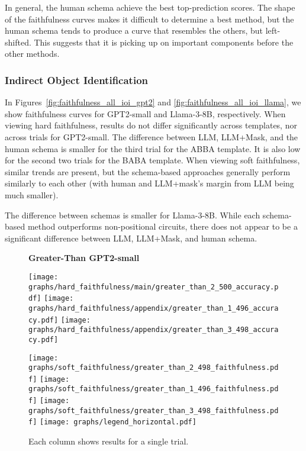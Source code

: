 In general, the human schema achieve the best top-prediction scores. The shape of the faithfulness curves makes it difficult to determine a best method, but the human schema tends to produce a curve that resembles the others, but left-shifted. This suggests that it is picking up on important components before the other methods. 

\subsubsection{Indirect Object Identification}\label{ap:faithfulness_curves_ioi}
In Figures~\ref{fig:faithfulness_all_ioi_gpt2} and \ref{fig:faithfulness_all_ioi_llama}, we show faithfulness curves for GPT2-small and Llama-3-8B, respectively. When viewing hard faithfulness, results do not differ significantly across templates, nor across trials for GPT2-small. The difference between LLM, LLM+Mask, and the human schema is smaller for the third trial for the ABBA template. It is also low for the second two trials for the BABA template. When viewing soft faithfulness, similar trends are present, but the schema-based approaches generally perform similarly to each other (with human and LLM+mask's margin from LLM being much smaller).

The difference between schemas is smaller for Llama-3-8B. While each schema-based method outperforms non-positional circuits, there does not appear to be a significant difference between LLM, LLM+Mask, and human schema.

\begin{figure*}
    \centering
    \textbf{Greater-Than GPT2-small}

    \texttt{[image: graphs/hard\_faithfulness/main/greater\_than\_2\_500\_accuracy.pdf]} \hfill 
    \texttt{[image: graphs/hard\_faithfulness/appendix/greater\_than\_1\_496\_accuracy.pdf]} \hfill 
    \texttt{[image: graphs/hard\_faithfulness/appendix/greater\_than\_3\_498\_accuracy.pdf]} \hfill 

    
    \vspace{0.05cm}
    \texttt{[image: graphs/soft\_faithfulness/greater\_than\_2\_498\_faithfulness.pdf]} \hfill 
    \texttt{[image: graphs/soft\_faithfulness/greater\_than\_1\_496\_faithfulness.pdf]} \hfill 
    \texttt{[image: graphs/soft\_faithfulness/greater\_than\_3\_498\_faithfulness.pdf]} \hfill 
    \vspace{0.05cm}
    \texttt{[image: graphs/legend\_horizontal.pdf]} \hfill 
\caption{Each column shows results for a single trial.}
\label{fig:faithfulness_all_gt}
\end{figure*}

